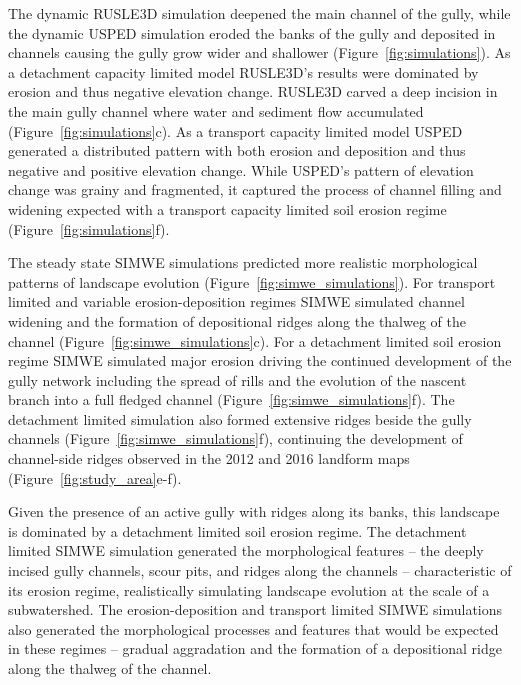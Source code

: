 \documentclass[gmd, manuscript]{copernicus}
\begin{document}
The dynamic RUSLE3D simulation
deepened the main channel of the gully,
while the dynamic USPED simulation
eroded the banks of the gully
and deposited in channels
causing the gully grow wider and shallower
(Figure~\ref{fig:simulations}). 
%
As a detachment capacity limited model
RUSLE3D's results were
dominated by erosion and 
thus negative elevation change.
%
RUSLE3D carved a deep incision 
in the main gully channel
where water and sediment flow accumulated
(Figure~\ref{fig:simulations}c). 
%
As a transport capacity limited model
USPED generated a distributed pattern
with both erosion and deposition and thus
negative and positive elevation change. 
%
While USPED's pattern of elevation change
was grainy and fragmented, 
it captured the process of channel 
filling and widening expected with 
a transport capacity limited soil erosion regime
(Figure~\ref{fig:simulations}f). 

The steady state SIMWE simulations 
predicted more realistic morphological patterns 
of landscape evolution
(Figure~\ref{fig:simwe_simulations}). 
%
For transport limited and
variable erosion-deposition regimes
SIMWE simulated
channel widening 
and the formation of depositional ridges
along the thalweg of the channel
(Figure~\ref{fig:simwe_simulations}c).
%
For a detachment limited soil erosion regime
SIMWE simulated major erosion
driving the continued development 
of the gully network
including the spread of rills and
the evolution of the nascent branch
into a full fledged channel
(Figure~\ref{fig:simwe_simulations}f). 
%
The detachment limited simulation
also formed extensive ridges
beside the gully channels 
(Figure~\ref{fig:simwe_simulations}f), 
continuing the development of 
channel-side ridges
observed in the 2012 and 2016 landform maps
(Figure~\ref{fig:study_area}e-f). 

Given the presence of an active gully 
with ridges along its banks,
this landscape is dominated by 
a detachment limited soil erosion regime.
%
The detachment limited SIMWE simulation 
generated the morphological features
-- the deeply incised gully channels, 
scour pits,
and ridges along the channels 
--
characteristic of its erosion regime,
realistically simulating landscape evolution 
at the scale of a subwatershed. 
%
The erosion-deposition and transport limited 
SIMWE simulations also generated 
the morphological processes and features
that would be expected in these regimes
-- gradual aggradation
and the formation of a depositional ridge 
along the thalweg of the channel.
\end{document}
